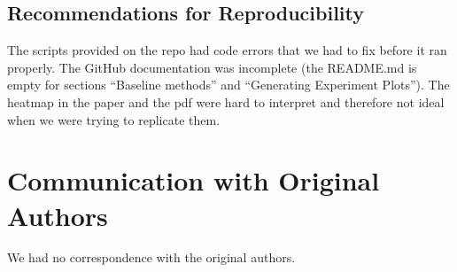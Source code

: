 \documentclass{article}
\begin{document}
\subsection{Recommendations for Reproducibility}
The scripts provided on the repo had code errors that we had to fix before it ran properly. The GitHub documentation was incomplete
(the README.md is empty for sections “Baseline methods” and “Generating Experiment Plots”). The heatmap in the paper and the pdf were hard to interpret and therefore not ideal when we were trying to
replicate them.

\section*{Communication with Original Authors}
We had no correspondence with the original authors.



\end{document}
